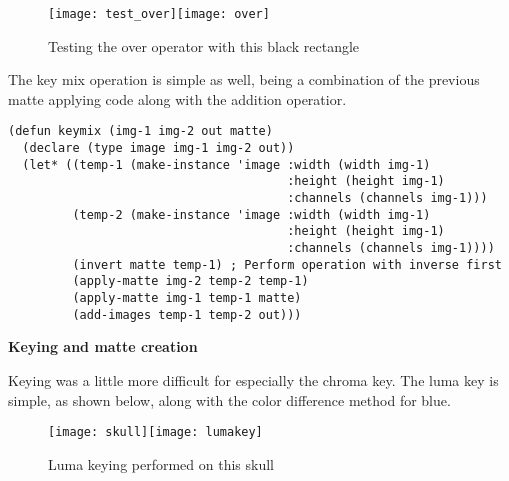 \documentclass[11pt]{report}
\begin{document}
\begin{figure}[h!]
\centering
    \texttt{[image: test\_over]}\texttt{[image: over]}
\caption{Testing the over operator with this black rectangle}
\end{figure}

The key mix operation is simple as well, being a combination of the previous
matte applying code along with the addition operatior.

\begin{lstlisting}
(defun keymix (img-1 img-2 out matte)
  (declare (type image img-1 img-2 out))
  (let* ((temp-1 (make-instance 'image :width (width img-1)
                                       :height (height img-1)
                                       :channels (channels img-1)))
         (temp-2 (make-instance 'image :width (width img-1)
                                       :height (height img-1)
                                       :channels (channels img-1))))
         (invert matte temp-1) ; Perform operation with inverse first
         (apply-matte img-2 temp-2 temp-1)
         (apply-matte img-1 temp-1 matte)
         (add-images temp-1 temp-2 out)))
\end{lstlisting}

\bigskip
\textbf{Keying and matte creation}

Keying was a little more difficult for especially the chroma key. The luma key
is simple, as shown below, along with the color difference method for blue.

\begin{figure}[h!]
\centering
    \texttt{[image: skull]}\texttt{[image: lumakey]}
\caption{Luma keying performed on this skull}
\end{figure}
\end{document}
